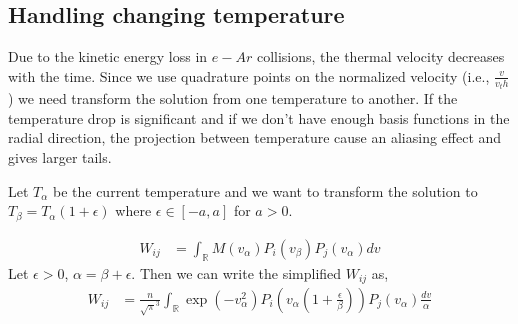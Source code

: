 \documentclass{article}
\newcommand{\reals}{\mathbb{R}}
\begin{document}
\subsection{Handling changing temperature}
Due to the kinetic energy loss in $e-Ar$ collisions, the thermal velocity decreases with the time. Since we use quadrature points on the normalized velocity (i.e., $\frac{v}{v_th}$) we need transform the solution from one temperature to another. If the temperature drop is significant and if we don't have enough basis functions in the radial direction, the projection between temperature cause an aliasing effect and gives larger tails. 

Let $T_\alpha$ be the current temperature and we want to transform the solution to $T_\beta=T_\alpha (1+ \epsilon)$ where $\epsilon \in [-a,a]$ for $a>0$.

\begin{align}
W_{ij} &= \int_{\reals} M(v_\alpha) P_i(v_\beta) P_j(v_\alpha)dv \label{eq:basis_change}
\end{align}
Let $\epsilon >0$, $\alpha = \beta + \epsilon$. Then we can write the simplified $W_{ij}$ as, 
\begin{align}
W_{ij} &= \frac{n}{\sqrt{\pi}^{3}}  \int_{\reals}  \exp(-v_\alpha^2) P_i (v_\alpha (1 + \frac{\epsilon}{\beta})) P_j(v_\alpha) \frac{dv}{\alpha} \\
\end{align}
\end{document}
